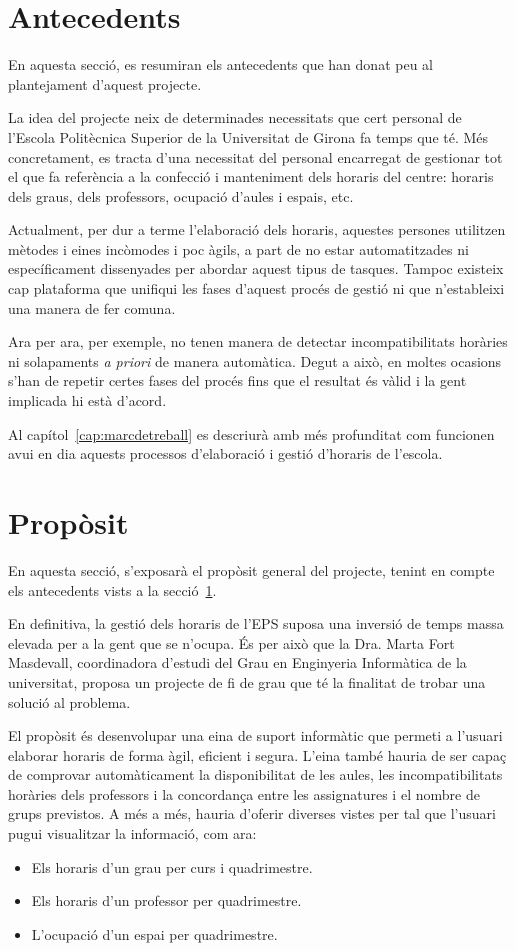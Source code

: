 \documentclass[a4paper,12pt]{ThesisStyle}
\begin{document}
\section{Antecedents}
\label{sec:antecedents}

En aquesta secció, es resumiran els antecedents que han donat peu al plantejament d'aquest projecte.

La idea del projecte neix de determinades necessitats que cert personal de l'Escola Politècnica Superior de la Universitat de Girona fa temps que té. Més concretament, es tracta d'una necessitat del personal encarregat de gestionar tot el que fa referència a la confecció i manteniment dels horaris del centre: horaris dels graus, dels professors, ocupació d'aules i espais, etc.

Actualment, per dur a terme l'elaboració dels horaris, aquestes persones utilitzen mètodes i eines incòmodes i poc àgils, a part de no estar automatitzades ni específicament dissenyades per abordar aquest tipus de tasques. Tampoc existeix cap plataforma que unifiqui les fases d'aquest procés de gestió ni que n'estableixi una manera de fer comuna.

Ara per ara, per exemple, no tenen manera de detectar incompatibilitats horàries ni solapaments \textit{a priori} de manera automàtica. Degut a això, en moltes ocasions s'han de repetir certes fases del procés fins que el resultat és vàlid i la gent implicada hi està d'acord. 

Al capítol~\ref{cap:marcdetreball} es descriurà amb més profunditat com funcionen avui en dia aquests processos d'elaboració i gestió d'horaris de l'escola.

\section{Propòsit}
\label{sec:proposit}

En aquesta secció, s'exposarà el propòsit general del projecte, tenint en compte els antecedents vists a la secció~\ref{sec:antecedents}.

En definitiva, la gestió dels horaris de l'EPS suposa una inversió de temps massa elevada per a la gent que se n'ocupa. És per això que la Dra. Marta Fort Masdevall, coordinadora d'estudi del Grau en Enginyeria Informàtica de la universitat, proposa un projecte de fi de grau que té la finalitat de trobar una solució al problema.

El propòsit és desenvolupar una eina de suport informàtic que permeti a l'usuari elaborar horaris de forma àgil, eficient i segura. L'eina també hauria de ser capaç de comprovar automàticament la disponibilitat de les aules, les incompatibilitats horàries dels professors i la concordança entre les assignatures i el nombre de grups previstos. A més a més, hauria d'oferir diverses vistes per tal que l'usuari pugui visualitzar la informació, com ara:
\begin{itemize}
  \item Els horaris d'un grau per curs i quadrimestre.
  \item Els horaris d'un professor per quadrimestre.
  \item L'ocupació d'un espai per quadrimestre.
\end{itemize}
\end{document}
